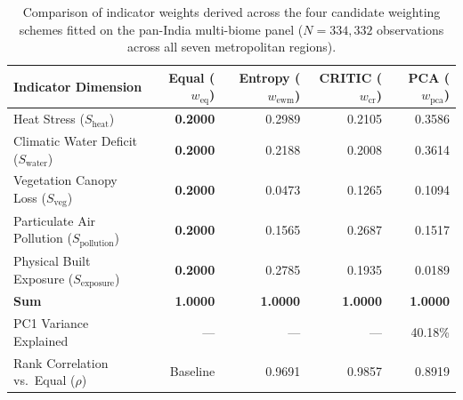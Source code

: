 \begin{table}[t]
\centering
\small
\caption{Comparison of indicator weights derived across the four candidate weighting schemes fitted on the pan-India multi-biome panel ($N = 334,332$ observations across all seven metropolitan regions).}
\label{tab:weights_comparison}
\begin{tabularx}{\textwidth}{@{}X r r r r@{}}
\toprule
\textbf{Indicator Dimension} & \textbf{Equal ($w_{\text{eq}}$)} & \textbf{Entropy ($w_{\text{ewm}}$)} & \textbf{CRITIC ($w_{\text{cr}}$)} & \textbf{PCA ($w_{\text{pca}}$)} \\
\midrule
Heat Stress ($S_{\text{heat}}$) & \textbf{0.2000} & 0.2989 & 0.2105 & 0.3586 \\
Climatic Water Deficit ($S_{\text{water}}$) & \textbf{0.2000} & 0.2188 & 0.2008 & 0.3614 \\
Vegetation Canopy Loss ($S_{\text{veg}}$) & \textbf{0.2000} & 0.0473 & 0.1265 & 0.1094 \\
Particulate Air Pollution ($S_{\text{pollution}}$) & \textbf{0.2000} & 0.1565 & 0.2687 & 0.1517 \\
Physical Built Exposure ($S_{\text{exposure}}$) & \textbf{0.2000} & 0.2785 & 0.1935 & 0.0189 \\
\midrule
\textbf{Sum} & \textbf{1.0000} & \textbf{1.0000} & \textbf{1.0000} & \textbf{1.0000} \\
\midrule
PC1 Variance Explained & --- & --- & --- & 40.18\% \\
Rank Correlation vs.\ Equal ($\rho$) & Baseline & 0.9691 & 0.9857 & 0.8919 \\
\bottomrule
\end{tabularx}
\end{table}
